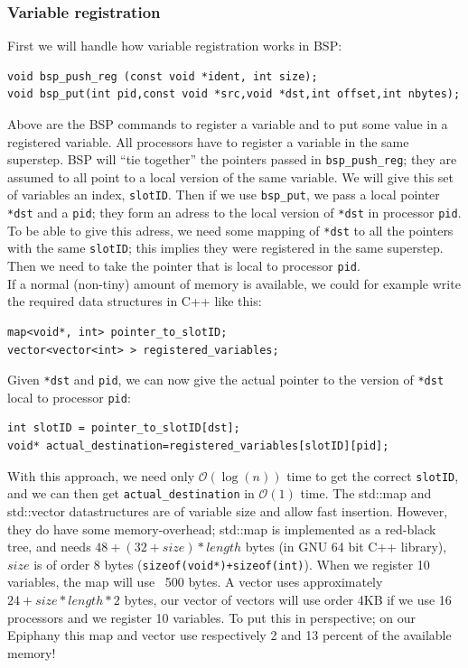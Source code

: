 \documentclass[fleqn]{article}
\renewcommand{\(}{\left(}
\renewcommand{\)}{\right)}
\begin{document}
\subsubsection{Variable registration}
First we will handle how variable registration works in BSP:
\\
\begin{lstlisting}
void bsp_push_reg (const void *ident, int size);
void bsp_put(int pid,const void *src,void *dst,int offset,int nbytes);
\end{lstlisting}
Above are the BSP commands to register a variable and to put some value in a registered variable.
All processors have to register a variable in the same superstep. BSP will ``tie together'' the pointers passed in \texttt{bsp\_push\_reg}; they are assumed to all point to a local version of the same variable. We will give this set of variables an index, \texttt{slotID}. Then if we use \texttt{bsp\_put}, we pass a local pointer \texttt{*dst} and a \texttt{\texttt{pid}}; they form an adress to the local version of \texttt{*dst} in processor \texttt{pid}. To be able to give this adress, we need some mapping of \texttt{*dst} to all the pointers with the same \texttt{slotID}; this implies they were registered in the same superstep. Then we need to take the pointer that is local to processor \texttt{pid}.
\\
If a normal (non-tiny) amount of memory is available, we could for example write the required data structures in C++ like this:
\begin{lstlisting}
map<void*, int> pointer_to_slotID;
vector<vector<int> > registered_variables;
\end{lstlisting}
Given \texttt{*dst} and \texttt{pid}, we can now give the actual pointer to the version of \texttt{*dst} local to processor \texttt{pid}:
\begin{lstlisting}
int slotID = pointer_to_slotID[dst];
void* actual_destination=registered_variables[slotID][pid];
\end{lstlisting}
With this approach, we need only $\mathcal{O}(\log(n))$ time to get the correct \texttt{slotID}, and we can then get \texttt{actual\_destination} in $\mathcal{O}(1)$ time. The std::map and std::vector datastructures are of variable size and allow fast insertion. However, they do have some memory-overhead; std::map is implemented as a red-black tree, and needs $48+(32+size)*length$ bytes (in GNU 64 bit C++ library), $size$ is of order 8 bytes (\texttt{sizeof(void*)+sizeof(int)}). When we register 10 variables, the map will use ~500 bytes. A vector uses approximately $24+size*length*2$ bytes, our vector of vectors will use order 4KB if we use 16 processors and we register 10 variables. To put this in perspective; on our Epiphany this map and vector use respectively 2 and 13 percent of the available memory!\\
\end{document}

